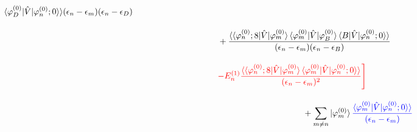 \begin{align}
{{    \braket{\varphi^{(0)}_{D}|\hat{V}|\varphi^{(0)}_n;0}\rangle}
    {(\epsilon_n-\epsilon_m)(\epsilon_n-\epsilon_D)}}\nn[10pt]
    &\hspace{100pt}
    +{\frac{\langle\braket{\varphi^{(0)}_{n};8|\hat{V}|\varphi^{(0)}_m}
    \langle{\varphi^{(0)}_{m}|\hat{V}|\varphi^{(0)}_B}\rangle
    \braket{B|\hat{V}|\varphi^{(0)}_n;0}\rangle}
    {(\epsilon_n-\epsilon_m)(\epsilon_n-\epsilon_B)}}\nn[10pt]
    &\hspace{100pt}
    \textcolor{red}{-E^{(1)}_n
    \frac{\langle\braket{\varphi^{(0)}_{n};8|\hat{V}|\varphi^{(0)}_m}
    \braket{\varphi^{(0)}_{m}|\hat{V}|\varphi^{(0)}_n;0}\rangle}{(\epsilon_n-\epsilon_m)^2}
    \Biggr]}
    \nn[10pt]
    &\hspace{200pt}+
    \sum_{m\neq n}\ket{\varphi^{(0)}_m}
    \textcolor{blue}{
    \frac{\braket{\varphi^{(0)}_{m}|\hat{V}|\varphi^{(0)}_n;0}\rangle}{(\epsilon_n-\epsilon_m)}}
\end{align}



